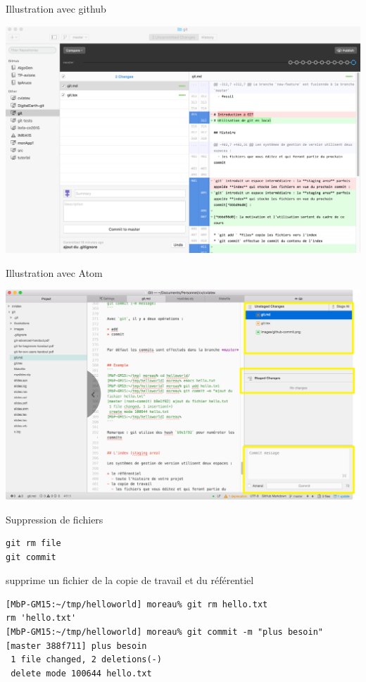 \begin{frame}{%
\protect\hypertarget{illustration-avec-github}{%
Illustration avec github}}

\includegraphics[width=1\textwidth]{images/github-commit.png}

\end{frame}

\begin{frame}{%
\protect\hypertarget{illustration-avec-atom}{%
Illustration avec Atom}}

\includegraphics[width=1\textwidth]{images/atom-commit.png}

\end{frame}

\begin{frame}[fragile]{%
\protect\hypertarget{suppression-de-fichiers}{%
Suppression de fichiers}}

\begin{verbatim}
git rm file
git commit
\end{verbatim}

supprime un fichier de la copie de travail et du référentiel

\begin{lstlisting}
[MbP-GM15:~/tmp/helloworld] moreau% git rm hello.txt
rm 'hello.txt'
[MbP-GM15:~/tmp/helloworld] moreau% git commit -m "plus besoin"
[master 388f711] plus besoin
 1 file changed, 2 deletions(-)
 delete mode 100644 hello.txt
\end{lstlisting}

\end{frame}

